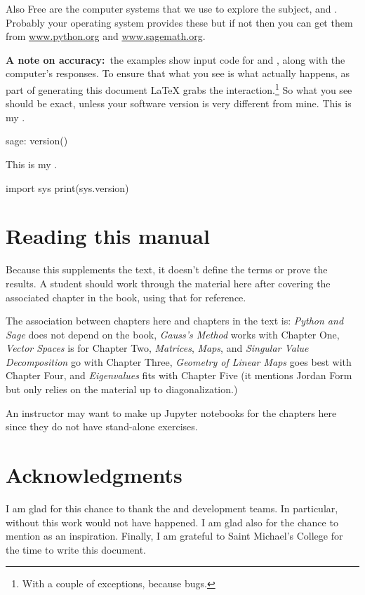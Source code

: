 Also Free are the computer systems that we use to explore the subject,
\python{} and \Sage{}.
Probably your operating system provides these but if not then 
you can get them from  
\href{http://www.python.org}{\url{www.python.org}}
and 
\href{https://www.sagemath.org}{\url{www.sagemath.org}}.

\textbf{A note on accuracy:}~the examples 
show input code for \python{} and \Sage{}, 
along with the computer's responses.
To ensure that what you see is what actually happens,
as part of generating this 
document \LaTeX{} grabs the interaction.\footnote{%
  With a couple of exceptions, because bugs.}
So what you see should be exact,
unless your software version is very different from mine.
This is my \Sage.
\begin{sagecommandline}
sage: version()  
\end{sagecommandline}
This is my \python{}. 
\begin{pythonconsole}
import sys
print(sys.version)
\end{pythonconsole}




\section{Reading this manual}
Because this supplements the text, 
it doesn't define the terms or prove the results.
A student should work through the material here after covering the associated
chapter in the book, using that for reference.

The association between chapters here and chapters in the text is:
\textit{Python and Sage} does not depend on the
book,
\textit{Gauss’s Method} works with Chapter One,
\textit{Vector Spaces} is for Chapter Two,
\textit{Matrices}, 
\textit{Maps}, and 
\textit{Singular Value Decomposition} go with Chapter Three,
\textit{Geometry of Linear Maps} goes best with Chapter Four,
and \textit{Eigenvalues} fits with Chapter Five
(it mentions Jordan Form but only relies on the material up to 
diagonalization.)

An instructor may want to make up Jupyter notebooks for the chapters here
since they do not have stand-alone exercises.




\section{Acknowledgments}
I am glad for this chance to thank the \python{} and
\Sage{} development teams.
In particular,
without \citep{SageTeam19ref} this work would not have happened.
I am glad also for the chance to mention 
\citep{Beezer11} as an inspiration.
Finally, I am grateful to Saint Michael's College for the 
time to write this document.





